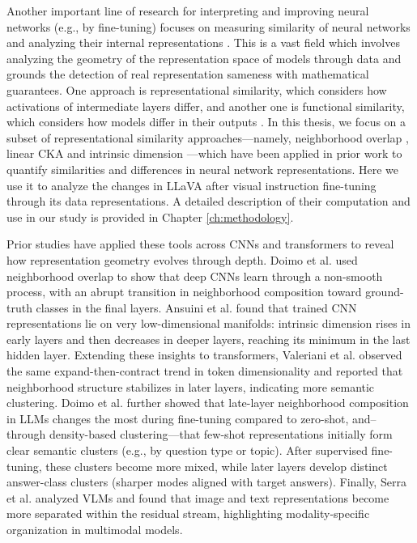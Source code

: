 Another important line of research for interpreting and improving neural networks (e.g., by fine-tuning) focuses on measuring similarity of neural networks and analyzing their internal representations  \cite{klabundeSimilarityNeuralNetwork2025}. This is a vast field which involves analyzing the geometry of the representation space of models through data and grounds the detection of real representation sameness with mathematical guarantees.  One approach is representational similarity, which considers how activations of intermediate layers differ, and another one is functional similarity, which considers how models differ in their outputs \cite{klabundeSimilarityNeuralNetwork2025}. In this thesis, we focus on a subset of representational similarity approaches---namely, neighborhood overlap \cite{doimoHierarchicalNucleationDeep2020}, linear CKA \cite{kornblithSimilarityNeuralNetwork2019} and intrinsic dimension \cite{ansuiniIntrinsicDimensionData2019}---which have been applied in prior work to quantify similarities and differences in neural network representations. Here we use it to analyze the changes in LLaVA after visual instruction fine-tuning through its data representations.  A detailed description of their computation and use in our study is provided in Chapter \ref{ch:methodology}.

Prior studies have applied these tools across CNNs and transformers to reveal how representation geometry evolves through depth. Doimo et al. \cite{doimoHierarchicalNucleationDeep2020} used neighborhood overlap to show that deep CNNs learn through a non-smooth process, with an abrupt transition in neighborhood composition toward ground-truth classes in the final layers. Ansuini et al. \cite{ansuiniIntrinsicDimensionData2019} found that trained CNN representations lie on very low-dimensional manifolds: intrinsic dimension rises in early layers and then decreases in deeper layers, reaching its minimum in the last hidden layer. Extending these insights to transformers, Valeriani et al. \cite{valerianiGeometryHiddenRepresentations2023} observed the same expand-then-contract trend in token dimensionality and reported that neighborhood structure stabilizes in later layers, indicating more semantic clustering. Doimo et al. \cite{doimoRepresentationLandscapeFewShot} further showed that late-layer neighborhood composition in LLMs changes the most during fine-tuning compared to zero-shot, and--through density-based clustering---that few-shot representations initially form clear semantic clusters (e.g., by question type or topic). After supervised fine-tuning, these clusters become more mixed, while later layers develop distinct answer-class clusters (sharper modes aligned with target answers). Finally, Serra et al. \cite{serraNarrowGateLocalizeda} analyzed VLMs and found that image and text representations become more separated within the residual stream, highlighting modality-specific organization in multimodal models.

